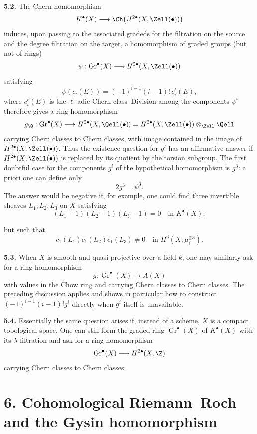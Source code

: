 \textbf{5.2.} The Chern homomorphism
\[
 K^\bullet(X)\longrightarrow
 \Ch\bigl(H^{2\bullet}(X,\Zell(\bullet))\bigr)
\]
induces, upon passing to the associated gradeds for the filtration on the
source and the degree filtration on the target, a homomorphism of graded
groups (but not of rings)
\[
 \psi:\operatorname{Gr}^\bullet(X)
   \longrightarrow H^{2\bullet}(X,\Zell(\bullet))
\]
satisfying
\[
 \psi(c_i(E))=(-1)^{i-1}(i-1)!\,c_i^\ell(E),
\]
where $c_i^\ell(E)$ is the $\ell$-adic Chern class. Division among the
components $\psi^i$ therefore gives a ring homomorphism
\[
 g_\Q:\operatorname{Gr}^\bullet(X)
   \longrightarrow H^{2\bullet}(X,\Qell(\bullet))
   =H^{2\bullet}(X,\Zell(\bullet))\otimes_{\Zell}\Qell
\]
carrying Chern classes to Chern classes, with image contained in the image
of $H^{2\bullet}(X,\Zell(\bullet))$. Thus the existence question for $g'$
has an affirmative answer if $H^{2\bullet}(X,\Zell(\bullet))$ is replaced
by its quotient by the torsion subgroup. The first doubtful case for the
components $g^i$ of the hypothetical homomorphism is $g^3$: a priori one
can define only
\[
 2g^3=\psi^3.
\]
The answer would be negative if, for example, one could find three
invertible sheaves $L_1,L_2,L_3$ on $X$ satisfying
\[
 (L_1-1)(L_2-1)(L_3-1)=0\quad\text{in }K^\bullet(X),
\]

but such that
\[
 c_1(L_1)c_1(L_2)c_1(L_3)\ne0
   \quad\text{in }H^6(X,\mu_\ell^{\otimes3}).
\]

\textbf{5.3.} When $X$ is smooth and quasi-projective over a field $k$,
one may similarly ask for a ring homomorphism
\[
 g:\operatorname{Gr}^\bullet(X)\longrightarrow A(X)
\]
with values in the Chow ring and carrying Chern classes to Chern classes.
The preceding discussion applies and shows in particular how to construct
$(-1)^{i-1}(i-1)!g^i$ directly when $g^i$ itself is unavailable.

\textbf{5.4.} Essentially the same question arises if, instead of a scheme,
$X$ is a compact topological space. One can still form the graded ring
$\operatorname{Gr}^\bullet(X)$ of $K^\bullet(X)$ with its
$\lambda$-filtration and ask for a ring homomorphism
\[
 \operatorname{Gr}^\bullet(X)\longrightarrow H^{2\bullet}(X,\Z)
\]
carrying Chern classes to Chern classes.

\section*{6. Cohomological Riemann--Roch and the Gysin homomorphism}

